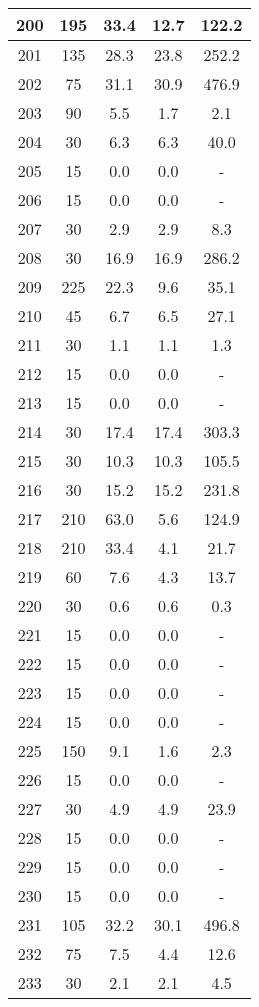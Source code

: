 \documentclass[a4paper,10pt]{article}
\begin{document}
\begin{table}
\begin{tabular}{|c|c|c|c|c|}
200 & 195 & 33.4 & 12.7 & 122.2 \\
\hline
201 & 135 & 28.3 & 23.8 & 252.2 \\
\hline
202 & 75 & 31.1 & 30.9 & 476.9 \\
\hline
203 & 90 & 5.5 & 1.7 & 2.1 \\
\hline
204 & 30 & 6.3 & 6.3 & 40.0 \\
\hline
205 & 15 & 0.0 & 0.0 & - \\
\hline
206 & 15 & 0.0 & 0.0 & - \\
\hline
207 & 30 & 2.9 & 2.9 & 8.3 \\
\hline
208 & 30 & 16.9 & 16.9 & 286.2 \\
\hline
209 & 225 & 22.3 & 9.6 & 35.1 \\
\hline
210 & 45 & 6.7 & 6.5 & 27.1 \\
\hline
211 & 30 & 1.1 & 1.1 & 1.3 \\
\hline
212 & 15 & 0.0 & 0.0 & - \\
\hline
213 & 15 & 0.0 & 0.0 & - \\
\hline
214 & 30 & 17.4 & 17.4 & 303.3 \\
\hline
215 & 30 & 10.3 & 10.3 & 105.5 \\
\hline
216 & 30 & 15.2 & 15.2 & 231.8 \\
\hline
217 & 210 & 63.0 & 5.6 & 124.9 \\
\hline
218 & 210 & 33.4 & 4.1 & 21.7 \\
\hline
219 & 60 & 7.6 & 4.3 & 13.7 \\
\hline
220 & 30 & 0.6 & 0.6 & 0.3 \\
\hline
221 & 15 & 0.0 & 0.0 & - \\
\hline
222 & 15 & 0.0 & 0.0 & - \\
\hline
223 & 15 & 0.0 & 0.0 & - \\
\hline
224 & 15 & 0.0 & 0.0 & - \\
\hline
225 & 150 & 9.1 & 1.6 & 2.3 \\
\hline
226 & 15 & 0.0 & 0.0 & - \\
\hline
227 & 30 & 4.9 & 4.9 & 23.9 \\
\hline
228 & 15 & 0.0 & 0.0 & - \\
\hline
229 & 15 & 0.0 & 0.0 & - \\
\hline
230 & 15 & 0.0 & 0.0 & - \\
\hline
231 & 105 & 32.2 & 30.1 & 496.8 \\
\hline
232 & 75 & 7.5 & 4.4 & 12.6 \\
\hline
233 & 30 & 2.1 & 2.1 & 4.5 \\

\end{tabular}
\end{table}
\end{document}
